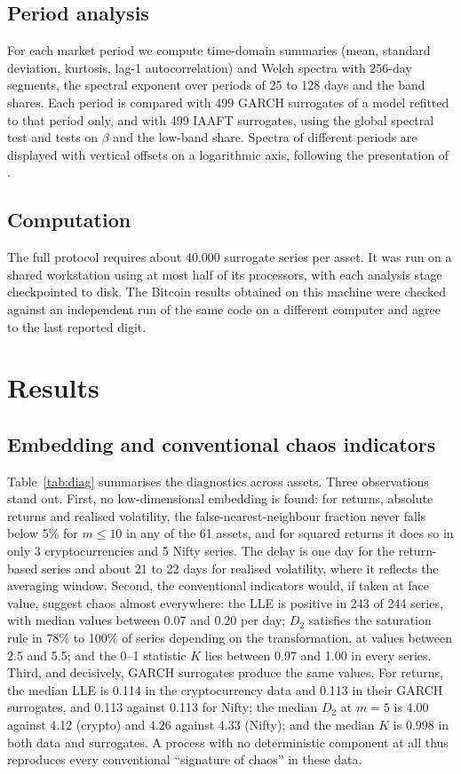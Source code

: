 \documentclass[11pt,a4paper]{article}
\begin{document}
\subsection{Period analysis}
For each market period we compute time-domain summaries (mean, standard deviation, kurtosis, lag-1
autocorrelation) and Welch spectra with 256-day segments, the spectral exponent over periods of 25 to 128 days and
the band shares. Each period is compared with 499 GARCH surrogates of a model refitted to that period only, and with
499 IAAFT surrogates, using the global spectral test and tests on $\beta$ and the low-band share. Spectra of different
periods are displayed with vertical offsets on a logarithmic axis, following the presentation of
\citet{KailashamKhair2023}.

\subsection{Computation}
The full protocol requires about 40,000 surrogate series per asset. It was run on a shared workstation using at most
half of its processors, with each analysis stage checkpointed to disk. The Bitcoin results obtained on this machine
were checked against an independent run of the same code on a different computer and agree to the last reported
digit.

\section{Results}\label{sec:results}

\subsection{Embedding and conventional chaos indicators}

Table~\ref{tab:diag} summarises the diagnostics across assets. Three observations stand out. First, no
low-dimensional embedding is found: for returns, absolute returns and realised volatility, the false-nearest-neighbour
fraction never falls below 5\% for $m\le 10$ in any of the 61 assets, and for squared returns it does so in only 3
cryptocurrencies and 5 Nifty series. The delay is one day for the return-based series and about 21 to 22 days for
realised volatility, where it reflects the averaging window. Second, the conventional indicators would, if taken at
face value, suggest chaos almost everywhere: the LLE is positive in 243 of 244 series, with median values between
0.07 and 0.20 per day; $D_2$ satisfies the saturation rule in 78\% to 100\% of series depending on the transformation,
at values between 2.5 and 5.5; and the 0--1 statistic $K$ lies between 0.97 and 1.00 in every series. Third, and
decisively, GARCH surrogates produce the same values. For returns, the median LLE is 0.114 in the cryptocurrency data
and 0.113 in their GARCH surrogates, and 0.113 against 0.113 for Nifty; the median $D_2$ at $m=5$ is 4.00 against
4.12 (crypto) and 4.26 against 4.33 (Nifty); and the median $K$ is 0.998 in both data and surrogates. A process with no
deterministic component at all thus reproduces every conventional ``signature of chaos'' in these data.
\end{document}
